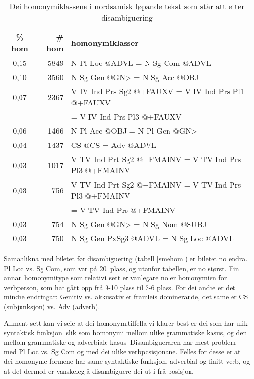 \documentclass[a4paper,norsk]{article}
\begin{document}
\begin{table}[htdp]
\caption{Dei homonymiklassene i nordsamisk løpande tekst som står att etter disambiguering}
\begin{center}
\begin{tabular}{|c|r|l|}
\hline
\% hom & \# hom & homonymiklasser \\
\hline
0,15 & 5849 & N Pl Loc @ADVL = N Sg Com @ADVL \\ 
0,10 & 3560 & N Sg Gen @GN> = N Sg Acc @OBJ \\ 
0,07 & 2367 & V IV Ind Prs Sg2 @+FAUXV = V IV Ind Prs Pl1 @+FAUXV \\
     &      &  = V IV Ind Prs Pl3 @+FAUXV \\ 
0,06 & 1466 & N Pl Acc @OBJ = N Pl Gen @GN> \\ 
0,04 & 1437 & CS @CS = Adv @ADVL \\ 
0,03 & 1017 & V TV Ind Prt Sg2 @+FMAINV = V TV Ind Prs Pl3 @+FMAINV \\ 
0,03 & 756 & V TV Ind Prt Sg2 @+FMAINV = V TV Ind Prs Pl3 @+FMAINV \\
     &     &  = V TV Ind Prs @+FMAINV \\ 
0,03 & 754 & N Sg Gen @GN> = N Sg Nom @SUBJ \\ 
0,03 & 750 & N Sg Gen PxSg3 @ADVL = N Sg Loc @ADVL \\ 
\hline
\end{tabular}
\end{center}
\label{smedishom}
\end{table}%


Samanlikna med biletet før disambiguering (tabell \ref{smehom}) er biletet no endra. Pl Loc vs. Sg Com, som var på 20. plass, og utanfor tabellen, er no størst. Ein annan homonymitype som relativt sett er vanlegare no er homonymien for verbperson, som har gått opp frå 9-10 plass til 3-6 plass. For dei andre er det mindre endringar: Genitiv vs. akkusativ er framleis dominerande, det same er CS (subjunksjon) vs. Adv (adverb).

Allment sett kan vi seie at dei homonymitilfella vi klarer best er dei som har ulik syntaktisk funksjon, slik som homonymi mellom ulike grammatiske kasus, og den mellom grammatiske og adverbiale kasus. Disambigueraren har mest problem med Pl Loc vs. Sg Com og med dei ulike verbposisjonane. Felles for desse er at dei homonyme formene har same syntaktiske funksjon, adverbial og finitt verb, og at det dermed er vanskeleg å disambiguere dei ut i frå posisjon.
\end{document}
